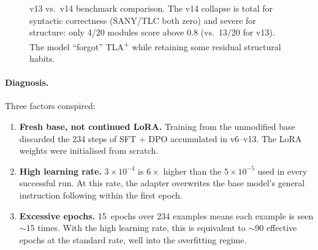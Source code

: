 \documentclass[11pt]{article}
\begin{document}
\begin{figure}[h!]
\centering
{}
\caption{v13 vs.\ v14 benchmark comparison.  The v14 collapse is
total for syntactic correctness (SANY/TLC both zero) and severe for
structure: only 4/20 modules score above 0.8 (vs.\ 13/20 for v13).
The model ``forgot'' TLA\textsuperscript{+} while retaining some
residual structural habits.}
\label{fig:v14-autopsy}
\end{figure}

\paragraph{Diagnosis.}  Three factors conspired:
\begin{enumerate}[leftmargin=1.6em, itemsep=1pt]
\item \textbf{Fresh base, not continued LoRA.}  Training from the
  unmodified base discarded the 234 steps of SFT + DPO accumulated in
  v6--v13.  The LoRA weights were initialised from scratch.
\item \textbf{High learning rate.}  $3 \times 10^{-4}$ is $6\times$
  higher than the $5 \times 10^{-5}$ used in every successful run.  At
  this rate, the adapter overwrites the base model's general instruction
  following within the first epoch.
\item \textbf{Excessive epochs.}  15~epochs over 234 examples means
  each example is seen $\sim$15 times.  With the high learning rate,
  this is equivalent to $\sim$90 effective epochs at the standard rate,
  well into the overfitting regime.
\end{enumerate}
\end{document}
